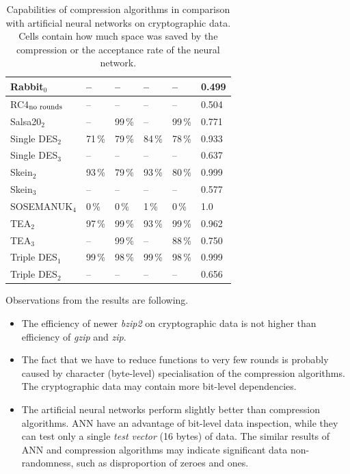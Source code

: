 \documentclass[
    digital,    %
    oneside,    %
    color,
    11pt,
    nocover,
    notable,
    nolof,
    nolot,
]{fithesis3}
\newcommand{\fd}{\cellcolor{myred!15}}
\newcommand{\fn}{\cellcolor{mygreen!20}}
\begin{document}
\begin{table}[t]
\begin{tabular}{@{}l|lllll}
Rabbit$_{0}$                     & --     \fn & --     \fn & --     \fn & --     \fn & 0.499 \fn \\ \hline
RC4$_{\textnormal{no rounds}}$   & --     \fn & --     \fn & --     \fn & --     \fn & 0.504 \fn \\ \hline
Salsa20$_{2}$                    & --     \fn & 99\,\% \fd & --     \fn & 99\,\% \fd & 0.771 \fd \\ \hline
Single DES$_{2}$                 & 71\,\% \fd & 79\,\% \fd & 84\,\% \fd & 78\,\% \fd & 0.933 \fd \\
Single DES$_{3}$                 & --     \fn & --     \fn & --     \fn & --     \fn & 0.637 \fd \\ \hline
Skein$_{2}$                      & 93\,\% \fd & 79\,\% \fd & 93\,\% \fd & 80\,\% \fd & 0.999 \fd \\ \hline
Skein$_{3}$                      & --     \fn & --     \fn & --     \fn & --     \fn & 0.577 \fd \\ \hline
SOSEMANUK$_{4}$                  & 0\,\%  \fd & 0\,\%  \fd & 1\,\%  \fd & 0\,\%  \fd & 1.0   \fd \\ \hline
TEA$_{2}$                        & 97\,\% \fd & 99\,\% \fd & 93\,\% \fd & 99\,\% \fd & 0.962 \fd \\
TEA$_{3}$                        & --     \fn & 99\,\% \fd & --     \fn & 88\,\% \fd & 0.750 \fd \\ \hline
Triple DES$_{1}$                 & 99\,\% \fd & 98\,\% \fd & 99\,\% \fd & 98\,\% \fd & 0.999 \fd \\
Triple DES$_{2}$                 & --     \fn & --     \fn & --     \fn & --     \fn & 0.656 \fd

\end{tabular}

\caption{Capabilities of compression algorithms in comparison with artificial neural networks on cryptographic data. Cells contain how much space was saved by the compression or the acceptance rate of the neural network.}
\label{table:res-compression}
\end{table}

Observations from the results are following.

\begin{itemize}
    \item The efficiency of newer \textit{bzip2} on cryptographic data is not higher than efficiency of \textit{gzip} and \textit{zip}.
    \item The fact that we have to reduce functions to very few rounds is probably caused by character (byte-level) specialisation of the compression algorithms. The cryptographic data may contain more bit-level dependencies.
    \item The artificial neural networks perform slightly better than compression algorithms. ANN have an advantage of bit-level data inspection, while they can test only a single \textit{test vector} (16 bytes) of data. The similar results of ANN and compression algorithms may indicate significant data non-randomness, such as disproportion of zeroes and ones.
\end{itemize}
\end{document}
